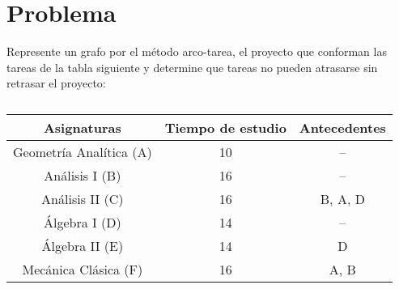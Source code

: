 \documentclass[autocontact]{gaceta}
\begin{document}
\section{Problema}
        Represente un grafo por el método arco-tarea, el proyecto que conforman las tareas de la tabla 
        siguiente y determine que tareas no pueden atrasarse sin retrasar el proyecto:
        \begin{table}[h]
            \begin{center}
            
                \begin{tabular}{|c|c|c|}
                    \hline
                    Asignaturas & Tiempo de estudio & Antecedentes \\
                    \hline
                    Geometría Analítica (A) & 10 & -- \\
                    \hline
                    Análisis I (B) & 16 & --\\
                    \hline
                    Análisis II (C) & 16 & B, A, D\\
                    \hline
                    Álgebra I (D) & 14 & -- \\
                    \hline
                    Álgebra II (E) & 14 & D \\
                    \hline
                    Mecánica Clásica (F) & 16 & A, B \\
                    \hline
                \end{tabular}   
            
            \end{center}
            \caption{}
        \end{table}
\end{document}
